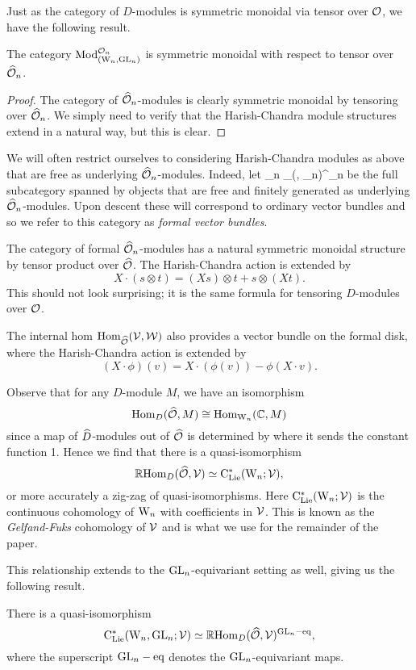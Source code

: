 Just as the category of $D$-modules is symmetric monoidal via tensor over $\mathcal O$, we have the following result.

\begin{lem}
The category ${\rm Mod}^{\mathcal O_n}_{({{\rm W}_n}, {\rm GL}_n)}$ is symmetric monoidal with respect to tensor over $\widehat{\mathcal O}_n$.
\end{lem} 

\begin{proof}
The category of $\widehat{\mathcal O}_n$-modules is clearly symmetric monoidal by tensoring over $\widehat{\mathcal O}_n$. We simply need to verify that the Harish-Chandra module structures extend in a natural way, but this is clear.
\end{proof}

We will often restrict ourselves to considering Harish-Chandra modules as above that are free as underlying $\widehat{\mathcal O}_n$-modules. 
Indeed, let
\ben
\VB_n \subset \Mod_{(\Vect, \GL_n)}^{\cO_n}
\een
be the full subcategory spanned by objects that are free and finitely generated as underlying $\widehat{\mathcal O}_n$-modules. 
Upon descent these will correspond to ordinary vector bundles and so
we refer to this category as {\em formal vector bundles}. 

The category of formal $\widehat{\mathcal O}_n$-modules has a natural symmetric monoidal structure by tensor product over $\widehat{\mathcal O}$. The Harish-Chandra action is extended by
\[
X \cdot (s \otimes t) = (X s) \otimes t + s \otimes (Xt). 
\]
This should not look surprising; it is the same formula for tensoring
$D$-modules over $\mathcal O$. 

The internal hom ${\rm Hom}_{\widehat{\mathcal O}}(\mathcal{V},\mathcal{W})$ also provides a vector bundle on the formal disk, 
where the Harish-Chandra action is extended by
\[
(X \cdot \phi)(v) = X \cdot (\phi(v)) - \phi(X\cdot v). 
\]

Observe that for any $D$-module $M$, we have an isomorphism
\[
{\rm Hom}_{D}(\widehat{\mathcal O}, M) \cong {\rm Hom}_{{{\rm W}_n}}(\mathbb C, M)
\]
since a map of $\widehat{D}$-modules out of $\widehat{\mathcal O}$ is determined by where it sends the constant function 1. 
Hence we find that there is a quasi-isomorphism 
\[
\mathbb R{\rm Hom}_{D}(\widehat{\mathcal O}, \mathcal{V}) \simeq {\rm C}_{{\rm Lie}}^*({{\rm W}_n} ; \mathcal{V}),
\]
or more accurately a zig-zag of quasi-isomorphisms. Here
${\rm C}_{{\rm Lie}}^*({{\rm W}_n} ; \mathcal{V})$ is the continuous cohomology of ${{\rm W}_n}$ with
coefficients in $\mathcal{V}$. This is known as the {\em Gelfand-Fuks}
cohomology of $\mathcal{V}$ and is what we use for the remainder of the
paper. 

This relationship extends to the ${\rm GL}_n$-equivariant setting as well, giving us the following result.

\begin{lem}
There is a quasi-isomorphism
\[
{\rm C}_{{\rm Lie}}^*({{\rm W}_n},{\rm GL}_n; \mathcal{V}) \simeq \mathbb R {\rm Hom}_D(\widehat{\mathcal O},\mathcal{V})^{{\rm GL}_n-{\rm eq}},
\]
where the superscript ${\rm GL}_n-{\rm eq}$ denotes the ${\rm GL}_n$-equivariant maps.
\end{lem}

